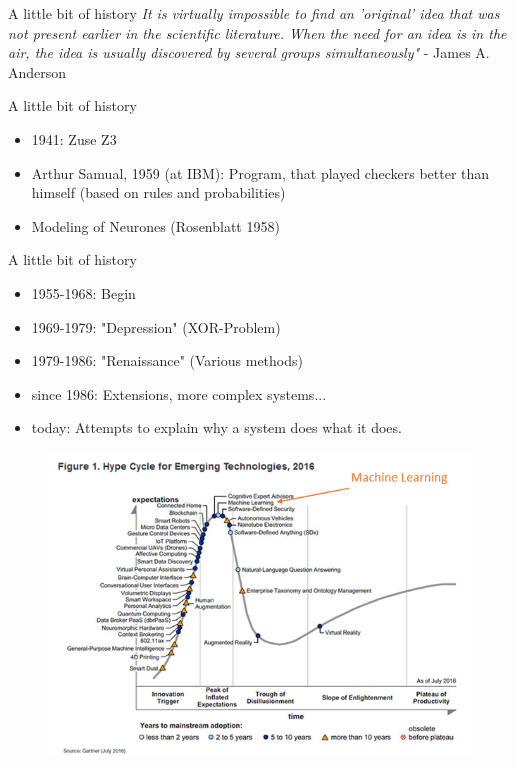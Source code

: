 \documentclass{beamer}
\begin{document}
	\begin{frame}{A little bit of history}
		\textit{It is virtually impossible to find an 'original' idea that was not present earlier in the scientific literature. When the need for an idea is in the air, the idea is usually discovered by several groups simultaneously"} - James A. Anderson
	\end{frame}	
	
	\begin{frame}{A little bit of history}
		\begin{itemize}
			\item 1941: Zuse Z3
			\item Arthur Samual, 1959 (at IBM): Program, that played checkers better than himself (based on rules and probabilities)
			\item Modeling of Neurones (Rosenblatt 1958)
		\end{itemize}
	\end{frame}	
	
	\begin{frame}{A little bit of history}
		\begin{itemize}
			\item 1955-1968: Begin
			\item 1969-1979: "Depression" (XOR-Problem)
			\item 1979-1986: "Renaissance" (Various methods)
			\item since 1986: Extensions, more complex systems...
			\item today: Attempts to explain why a system does what it does.
		\end{itemize}
        \begin{figure}
        \includegraphics[width = 0.7\linewidth]{figures/introduction/HypeCycle}
        \end{figure}
	\end{frame}	
\end{document}
